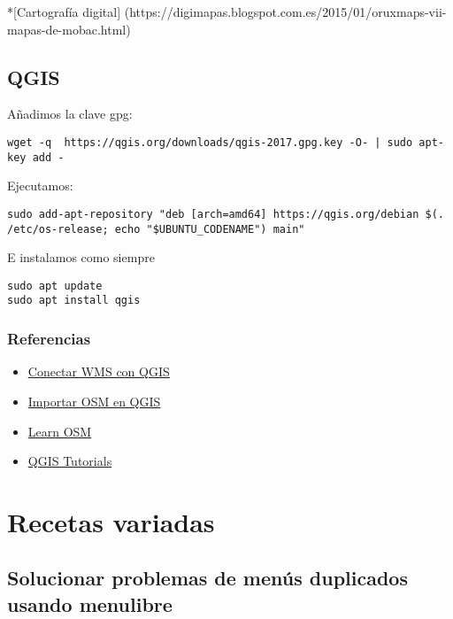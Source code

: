 \documentclass[
  12pt,
  spanish,
]{article}
\providecommand{\tightlist}{%
  \setlength{\itemsep}{0pt}\setlength{\parskip}{0pt}}
\begin{document}
*{[}Cartografía digital{]}
(https://digimapas.blogspot.com.es/2015/01/oruxmaps-vii-mapas-de-mobac.html)

\hypertarget{qgis}{%
\subsection{QGIS}\label{qgis}}

Añadimos la clave gpg:

\begin{verbatim}
wget -q  https://qgis.org/downloads/qgis-2017.gpg.key -O- | sudo apt-key add -
\end{verbatim}

Ejecutamos:

\begin{verbatim}
sudo add-apt-repository "deb [arch=amd64] https://qgis.org/debian $(. /etc/os-release; echo "$UBUNTU_CODENAME") main"
\end{verbatim}

E instalamos como siempre

\begin{verbatim}
sudo apt update
sudo apt install qgis
\end{verbatim}

\hypertarget{referencias-2}{%
\subsubsection{Referencias}\label{referencias-2}}

\begin{itemize}
\tightlist
\item
  \href{https://mappinggis.com/2015/09/como-conectar-con-servicios-wms-y-wfs-con-arcgis-qgis-y-gvsig/}{Conectar
  WMS con QGIS}
\item
  \href{https://www.altergeosistemas.com/blog/2014/03/28/importando-datos-de-osm-en-qgis-2/}{Importar
  OSM en QGIS}
\item
  \href{http://learnosm.org/es/osm-data/osm-in-qgis/}{Learn OSM}
\item
  \href{http://www.qgistutorials.com/es/docs/downloading_osm_data.html}{QGIS
  Tutorials}
\end{itemize}

\hypertarget{recetas-variadas}{%
\section{Recetas variadas}\label{recetas-variadas}}

\hypertarget{solucionar-problemas-de-menuxfas-duplicados-usando-menulibre}{%
\subsection{Solucionar problemas de menús duplicados usando
menulibre}\label{solucionar-problemas-de-menuxfas-duplicados-usando-menulibre}}
\end{document}
